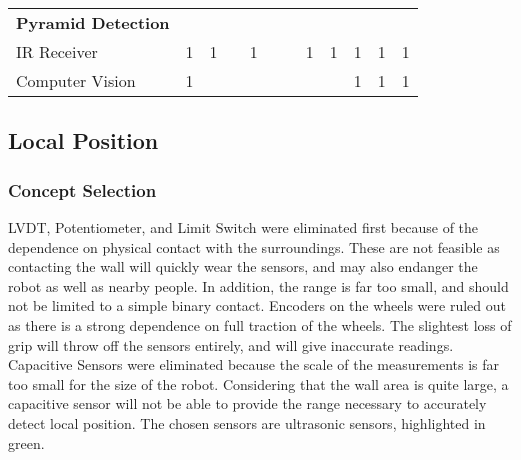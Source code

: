 \documentclass[12pt]{article}
\begin{document}
\begin{table}[H]
\begin{tabular}{p{15.645em}|c|c|c|c|c|c|c|c|c|c|c}
    \midrule
    \textbf{Pyramid Detection} &       &       &       &       &       &       &       &       &       &       &  \\
\rowcolor{green}    IR Receiver & 1     & 1     &       & 1     &       &       & 1     & 1     & 1     & 1     & 1 \\
    Computer Vision & 1     &       &       &       &       &       &       &       & 1     & 1     & 1 \\
    \end{tabular}%
  \label{tab:addlabel}%
\end{table}%




\subsection{Local Position}
\subsubsection{Concept Selection}
LVDT, Potentiometer, and Limit Switch were eliminated first because of the dependence on physical contact with the surroundings. These are not feasible as contacting the wall will quickly wear the sensors, and may also endanger the robot as well as nearby people. In addition, the range is far too small, and should not be limited to a simple binary contact.
Encoders on the wheels were ruled out as there is a strong dependence on full traction of the wheels. The slightest loss of grip will throw off the sensors entirely, and will give inaccurate readings.
Capacitive Sensors were eliminated because the scale of the measurements is far too small for the size of the robot. Considering that the wall area is quite large, a capacitive sensor will not be able to provide the range necessary to accurately detect local position.
The chosen sensors are ultrasonic sensors, highlighted in green.
\end{document}

